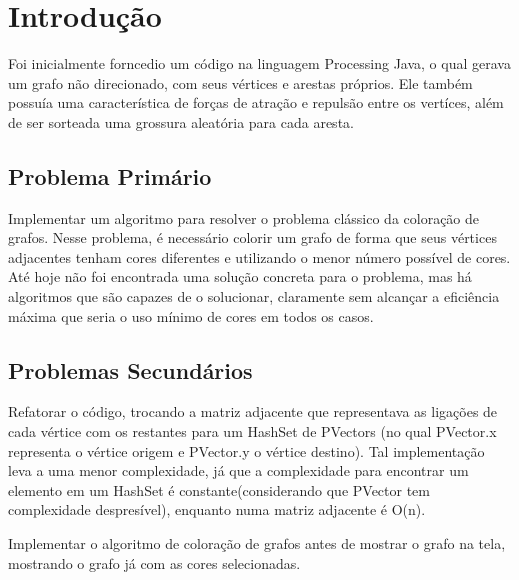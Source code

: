 \documentclass[
	12pt,				%
	oneside,			%
	a4paper,			%
	english,			%
	brazil,				%
	]{abntex2}
\begin{document}
\frenchspacing 

\imprimircapa

{
\ABNTEXchapterfont

\textual

\section{Introdução}

Foi inicialmente forncedio um código na linguagem Processing Java, o qual gerava um grafo não direcionado, com seus vértices e arestas próprios. Ele também possuía uma característica de forças de atração e repulsão entre os vertíces, além de ser sorteada uma grossura aleatória para cada aresta.

\subsection{Problema Primário}

Implementar um algoritmo para resolver o problema clássico da coloração de grafos. Nesse problema, é necessário colorir um grafo de forma que seus vértices adjacentes tenham cores diferentes e utilizando o menor número possível de cores. Até hoje não foi encontrada uma solução concreta para o problema, mas há algoritmos que são capazes de o solucionar, claramente sem alcançar a eficiência máxima que seria o uso mínimo de cores em todos os casos.

\subsection{Problemas Secundários}

Refatorar o código, trocando a matriz adjacente que representava as ligações de cada vértice com os restantes para um HashSet de PVectors (no qual PVector.x representa o vértice origem e PVector.y o vértice destino). Tal implementação leva a uma menor complexidade, já que a complexidade para encontrar um elemento em um HashSet é constante(considerando que PVector tem complexidade despresível), enquanto numa matriz adjacente é O(n).

Implementar o algoritmo de coloração de grafos antes de mostrar o grafo na tela, mostrando o grafo já com as cores selecionadas.

}
\end{document}
